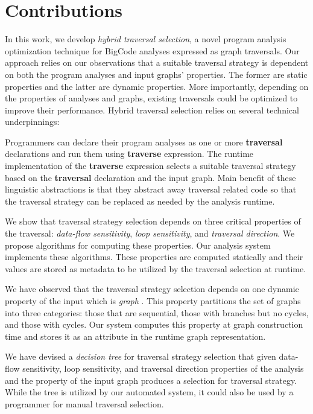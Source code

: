 \chapter{Contributions}

In this work, we develop {\em hybrid traversal selection}, a novel program
analysis optimization technique for BigCode analyses expressed as graph traversals.
Our approach relies on our observations that a suitable traversal strategy is
dependent on both the program analyses and input graphs' properties.
The former are static properties and the latter are dynamic properties.
More importantly, depending on the properties of analyses and graphs, existing
traversals could be optimized to improve their performance.  
Hybrid traversal selection relies on several technical underpinnings: 

Programmers can declare their program analyses
as one or more {\bf traversal} declarations and run them using {\bf traverse} expression.
The runtime implementation of the {\bf traverse} expression selects a suitable 
traversal strategy based on the {\bf traversal} declaration and the input graph.
Main benefit of these linguistic abstractions is that they abstract away 
traversal related code so that the traversal strategy can be replaced as needed 
by the analysis runtime.

We show that traversal strategy selection depends on three critical properties
of the traversal: {\em data-flow sensitivity}, {\em loop sensitivity}, and 
{\em traversal direction}. We propose algorithms for computing these properties.
Our analysis system implements these algorithms.
These properties are computed statically and their values are stored as metadata 
to be utilized by the traversal selection at runtime.

We have observed that the traversal strategy selection depends on one
dynamic property of the input which is {\em graph \graphprop{}}. This property partitions
the set of graphs into three categories: those that are sequential, those with branches
but no cycles, and those with cycles. Our system computes this property at 
graph construction time and stores it as an attribute in the runtime graph representation. 

We have devised a {\em decision tree} for traversal strategy selection that 
given data-flow sensitivity, loop sensitivity, and traversal direction properties 
of the analysis and the \graphprop{} property of the input graph produces 
a selection for traversal strategy.
While the tree is utilized by our automated system, it could also be used by 
a programmer for manual traversal selection.

